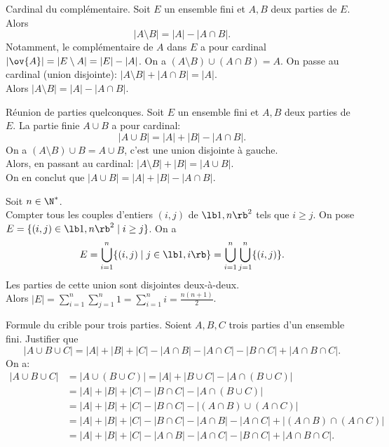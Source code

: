 \documentclass[11pt]{article}
\begin{document}
\begin{prop}{Cardinal du complémentaire.}{}
    Soit $E$ un ensemble fini et $A,B$ deux parties de $E$. Alors
    \begin{equation*}
        |A\setminus B| = |A| - |A\cap B|.
    \end{equation*}
    Notamment, le complémentaire de $A$ dans $E$ a pour cardinal $|\ov{A}|=|E\setminus A|=|E|-|A|$.
    \tcblower
    On a $(A\setminus B)\cup(A\cap B) = A$. On passe au cardinal (union disjointe): $|A\setminus B| + |A\cap B| = |A|$.\\
    Alors $|A\setminus B| = |A| - |A\cap B|$.
\end{prop}

\begin{prop}{Réunion de parties quelconques.}{}
    Soit $E$ un ensemble fini et $A,B$ deux parties de $E$. La partie finie $A\cup B$ a pour cardinal:
    \begin{equation*}
        |A\cup B| = |A|+|B|-|A\cap B|.
    \end{equation*}
    \tcblower
    On a $(A\setminus B)\cup B = A\cup B$, c'est une union disjointe à gauche.\\
    Alors, en passant au cardinal: $|A\setminus B| + |B| = |A\cup B|$.\\
    On en conclut que $|A\cup B|=|A|+|B|-|A\cap B|$.
\end{prop}

\begin{ex}{}{}
    Soit $n\in\N^*$.\\
    Compter tous les couples d'entiers $(i,j)$ de $\lb1,n\rb^2$ tels que $i\geq j$.
    \tcblower
    On pose $E=\{(i,j)\in\lb1,n\rb^2\mid i\geq j\}$. On a
    \begin{equation*}
        E=\bigcup_{i=1}^n\{(i,j)\mid j\in\lb1,i\rb\}=\bigcup_{i=1}^n\bigcup_{j=1}^n\{(i,j)\}.
    \end{equation*}
    Les parties de cette union sont disjointes deux-à-deux.\\
    Alors $|E|=\sum_{i=1}^n\sum_{j=1}^n1=\sum_{i=1}^ni=\frac{n(n+1)}{2}$.
\end{ex}

\begin{ex}{Formule du crible pour trois parties.}{}
    Soient $A,B,C$ trois parties d'un ensemble fini. Justifier que
    \begin{equation*}
        |A\cup B\cup C|=|A|+|B|+|C|-|A\cap B|-|A\cap C|-|B\cap C|+|A\cap B\cap C|.
    \end{equation*}
    \tcblower
    On a:
    \begin{align*}
        |A\cup B\cup C| &= |A\cup (B\cup C)| = |A| + |B\cup C| - |A\cap(B\cup C)|\\
        &= |A| + |B| + |C| - |B\cap C| - |A\cap(B\cup C)|\\
        &= |A|+|B|+|C|-|B\cap C| - |(A\cap B)\cup(A\cap C)|\\
        &= |A|+|B|+|C|-|B\cap C| - |A\cap B| - |A\cap C| + |(A\cap B)\cap(A\cap C)|\\
        &= |A|+|B|+|C|-|A\cap B|-|A\cap C|-|B\cap C|+|A\cap B\cap C|.
    \end{align*}
\end{ex}
\end{document}
